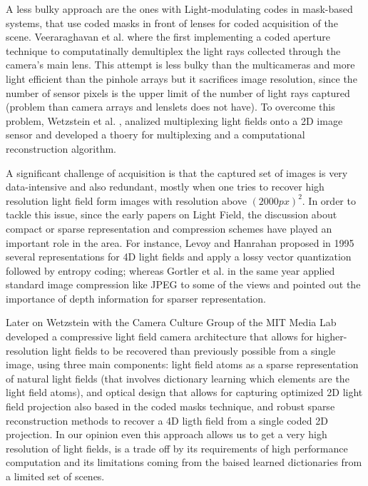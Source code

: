 \bigskip

A less bulky approach are the ones with Light-modulating codes in mask-based systems, that use coded masks in front of lenses for coded acquisition of the scene. Veeraraghavan et al. \cite{Veeraraghavan} where the first implementing a coded aperture technique to computatinally demultiplex the light rays collected through the camera's main lens. This attempt is less bulky than the multicameras and more light efficient than the pinhole arrays but it sacrifices image resolution, since the number of sensor pixels is the upper limit of the number of light rays captured (problem than camera arrays and lenslets does not have). To overcome this problem, Wetzstein et al. \cite{Wetzstein}, analized multiplexing light fields onto a 2D image sensor and developed a thoery for multiplexing and a computational reconstruction algorithm. 

\bigskip

A significant challenge of acquisition is that the captured set of images is very data-intensive and also redundant, mostly when one tries to recover high resolution light field form images with resolution above $(2000px)^2$. In order to tackle this issue, since the early papers on Light Field, the discussion about compact or sparse representation and compression schemes have played an important role in the area. For instance, Levoy and Hanrahan \cite{Levoy} proposed in 1995 several representations for 4D light fields and apply a lossy vector quantization followed by entropy coding; whereas Gortler et al. \cite{Gortler} in the same year applied standard image compression like JPEG to some of the views and pointed out the importance of depth information for sparser representation.

\bigskip

Later on Wetzstein with the Camera Culture Group of the MIT Media Lab developed a compressive light field camera architecture that allows for higher-resolution light fields to be recovered than previously possible from a single image, using three main components: light field atoms as a sparse representation of natural light fields (that involves dictionary learning which elements are the light field atoms), and optical design that allows for capturing optimized 2D light field projection also based in the coded masks technique, and robust sparse reconstruction methods to recover a 4D ligth field from a single coded 2D projection. In our opinion even this approach allows us to get a very high resolution of light fields, is a trade off by its requirements of high performance computation and its limitations coming from the baised learned dictionaries from a limited set of scenes. 


